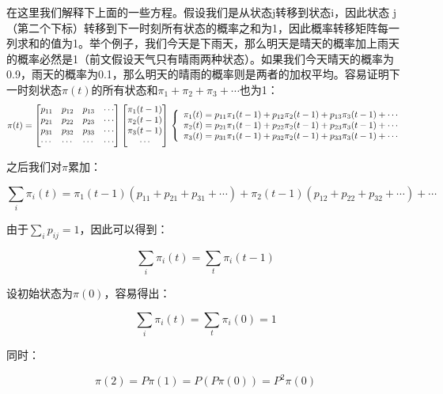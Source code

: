\begin{enumerate}
  在这里我们解释下上面的一些方程。假设我们是从状态j转移到状态i，因此状态
  j
  （第二个下标）转移到下一时刻所有状态的概率之和为1，因此概率转移矩阵每一列求和的值为1。举个例子，我们今天是下雨天，那么明天是晴天的概率加上雨天的概率必然是1（前文假设天气只有晴雨两种状态）。如果我们今天晴天的概率为0.9，雨天的概率为0.1，那么明天的晴雨的概率则是两者的加权平均。容易证明下一时刻状态\(\pi(t)\)的所有状态和\(\pi_{1}+\pi_{2}+\pi_{3}+\cdots\)也为1：
\begin{equation}
  \pi(t)
  =
  \begin{bmatrix} 
  p_{11} & p_{12} & p_{13} & \cdots\\
  p_{21} & p_{22} & p_{23} & \cdots\\
  p_{31} & p_{32} & p_{33} & \cdots\\
  \cdots & \cdots & \cdots & \cdots\\
  \end{bmatrix} 
  \begin{bmatrix} 
  \pi_{1}(t-1)\\
  \pi_{2}(t-1)\\
  \pi_{3}(t-1)\\
  \cdots\\
  \end{bmatrix} 
  \\
  \left\{
      \begin{array}{l}
              \pi_{1}(t)=p_{11}\pi_{1}(t-1)+p_{12}\pi_{2}(t-1)+p_{13}\pi_{3}(t-1)+\cdots \\
              \pi_{2}(t)=p_{21}\pi_{1}(t-1)+p_{22}\pi_{2}(t-1)+p_{23}\pi_{3}(t-1)+\cdots \\
              \pi_{3}(t)=p_{31}\pi_{1}(t-1)+p_{32}\pi_{2}(t-1)+p_{33}\pi_{3}(t-1)+\cdots
      \end{array}
  \right.
\end{equation}


  之后我们对\(\pi\)累加：

  \[\sum_i{\pi_i(t)}=\pi_{1}(t-1)(p_{11}+p_{21}+p_{31}+\cdots)+
  		       \pi_{2}(t-1)(p_{12}+p_{22}+p_{32}+\cdots)+\cdots\]

  由于\(\sum_{i}p_{ij}=1\)，因此可以得到：

  \[\sum_i{\pi_i(t)}=\sum_t{\pi_i(t-1)}\]

  设初始状态为\(\pi(0)\)，容易得出：

  \[\sum_i{\pi_i(t)}=\sum_t{\pi_i(0)}=1\]

  同时：

  \[\pi(2) = P\pi(1)=P(P\pi(0))=P^2\pi(0)\]


\end{enumerate}
